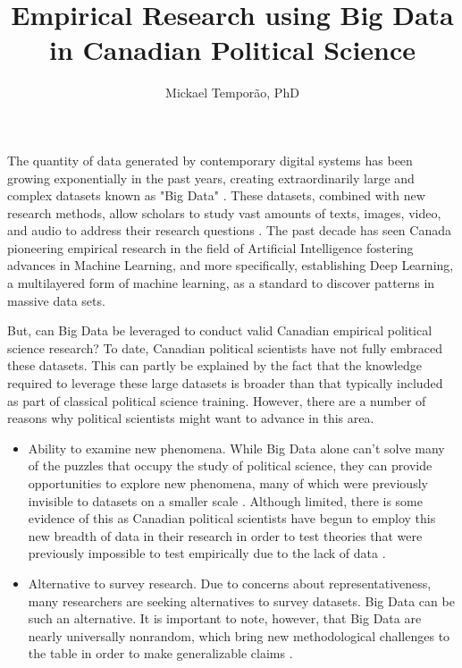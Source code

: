 \documentclass{article}
\author{Mickael Temporão, PhD}
\title{Empirical Research using Big Data in Canadian Political Science}
\begin{document}
\maketitle

The quantity of data generated by contemporary digital systems has been growing exponentially in the past years, creating extraordinarily large and complex datasets known as "Big Data" \citep{groves2011three, keller2017evolution, lazer2017data}.
These datasets, combined with new research methods, allow scholars to study vast amounts of texts, images, video, and audio to address their research questions \citep{lecun2015deep}.
The past decade has seen Canada pioneering empirical research in the field of Artificial Intelligence fostering advances in Machine Learning, and more specifically, establishing Deep Learning, a multilayered form of machine learning, as a standard to discover patterns in massive data sets.

But, can Big Data be leveraged to conduct valid Canadian empirical political science research?  To date, Canadian political scientists have not fully embraced these datasets. This can partly be explained by the fact that the knowledge required to leverage these large datasets is broader than that typically included as part of classical political science training. However, there are a number of reasons why political scientists might want to advance in this area.

\begin{itemize}
    \item Ability to examine new phenomena. While Big Data alone can’t solve many of the puzzles that occupy the study of political science, they can provide opportunities to explore new phenomena, many of which were previously invisible to datasets on a smaller scale \citep{grimmer2015we}. Although limited, there is some evidence of this as Canadian political scientists have begun to employ this new breadth of data in their research in order to test theories that were previously impossible to test empirically due to the lack of data \citep[see][]{rheault2019word, temporao2018ideological}.

    \item Alternative to survey research. Due to concerns about representativeness, many researchers are seeking alternatives to survey datasets. Big Data can be such an alternative. It is important to note, however, that Big Data are nearly universally nonrandom, which bring new methodological challenges to the table in order to make generalizable claims \citep{temporao2019crowdsourcing}.
\end{itemize}
\end{document}
